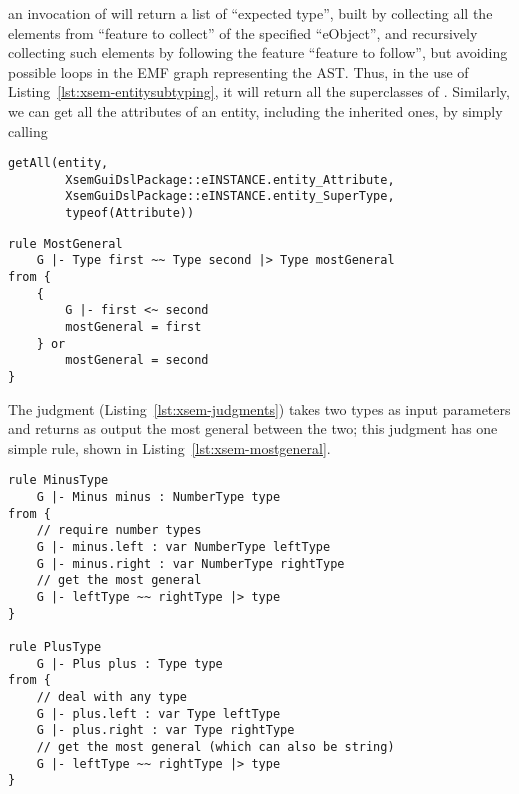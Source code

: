 \noindent an invocation of  will return a list of ``expected
type'', built by collecting all the elements from ``feature to collect'' of the
specified ``eObject'', and recursively collecting such elements by following the
feature ``feature to follow'', but avoiding possible loops in the EMF graph
representing the AST.
Thus, in the use of Listing~\ref{lst:xsem-entitysubtyping}, it will return all
the superclasses of .  Similarly, we can get all the attributes of
an entity, including the inherited ones, by simply calling

\begin{lstlisting}[language=xsemantics] 
	getAll(entity, 
		XsemGuiDslPackage::eINSTANCE.entity_Attribute,
		XsemGuiDslPackage::eINSTANCE.entity_SuperType,
		typeof(Attribute))
\end{lstlisting}

\begin{lstlisting}[language=xsemantics,float,label=lst:xsem-mostgeneral,caption=Rule
for \mytt{mostGeneral}.] 
rule MostGeneral
	G |- Type first ~~ Type second |> Type mostGeneral
from {
	{
		G |- first <~ second
		mostGeneral = first
	} or
		mostGeneral = second
}
\end{lstlisting}

The judgment  (Listing~\ref{lst:xsem-judgments}) takes two
types as input parameters and returns as output the most general between the
two; this judgment has one simple rule, shown in
Listing~\ref{lst:xsem-mostgeneral}.

\begin{lstlisting}[language=xsemantics,float,label=lst:xsem-binaryexp,caption=Some
rules for binary expressions.] 
rule MinusType
	G |- Minus minus : NumberType type
from {
	// require number types
	G |- minus.left : var NumberType leftType
	G |- minus.right : var NumberType rightType
	// get the most general
	G |- leftType ~~ rightType |> type
}

rule PlusType
	G |- Plus plus : Type type
from {
	// deal with any type
	G |- plus.left : var Type leftType
	G |- plus.right : var Type rightType
	// get the most general (which can also be string)
	G |- leftType ~~ rightType |> type
}
\end{lstlisting}

